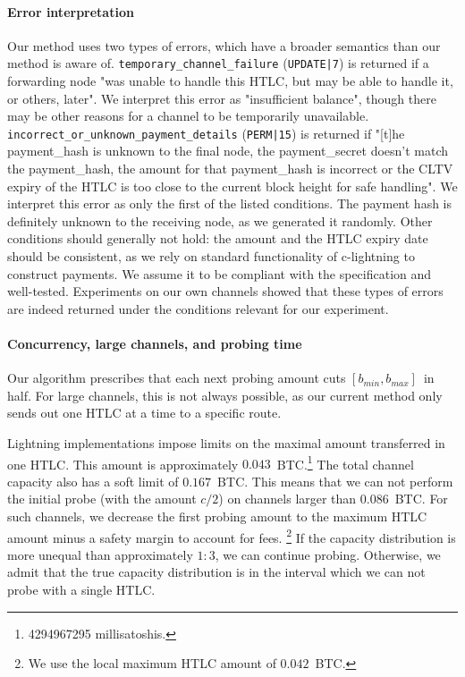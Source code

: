 \paragraph{Error interpretation}

Our method uses two types of errors, which have a broader semantics than our method is aware of.
\texttt{temporary\_channel\_failure} (\texttt{UPDATE|7}) is returned if a forwarding node "was unable to handle this HTLC, but may be able to handle it, or others, later".
We interpret this error as "insufficient balance", though there may be other reasons for a channel to be temporarily unavailable.
\texttt{incorrect\_or\_unknown\_payment\_details} (\texttt{PERM|15}) is returned if "[t]he payment\_hash is unknown to the final node, the payment\_secret doesn't match the payment\_hash, the amount for that payment\_hash is incorrect or the CLTV expiry of the HTLC is too close to the current block height for safe handling".
We interpret this error as only the first of the listed conditions.
The payment hash is definitely unknown to the receiving node, as we generated it randomly.
Other conditions should generally not hold: the amount and the HTLC expiry date should be consistent, as we rely on standard functionality of c-lightning to construct payments.
We assume it to be compliant with the specification and well-tested.
Experiments on our own channels showed that these types of errors are indeed returned under the conditions relevant for our experiment.


\paragraph{Concurrency, large channels, and probing time}

Our algorithm prescribes that each next probing amount cuts $[b_{min}, b_{max}]$~in half.
For large channels, this is not always possible, as our current method only sends out one HTLC at a time to a specific route.

Lightning implementations impose limits on the maximal amount transferred in one HTLC.
This amount is approximately $0.043$~BTC.\footnote{4294967295 millisatoshis.}
The total channel capacity also has a soft limit of $0.167$~BTC.
This means that we can not perform the initial probe (with the amount $c / 2$) on channels larger than $0.086$~BTC.
For such channels, we decrease the first probing amount to the maximum HTLC amount minus a safety margin to account for fees.
\footnote{We use the local maximum HTLC amount of $0.042$~BTC.}
If the capacity distribution is more unequal than approximately $1:3$, we can continue probing.
Otherwise, we admit that the true capacity distribution is in the interval which we can not probe with a single HTLC.

